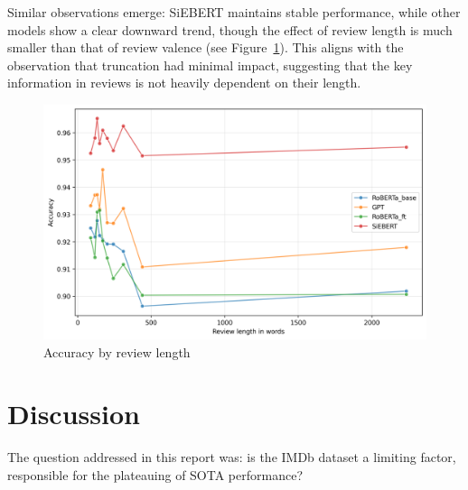 \documentclass{article}
\begin{document}
Similar observations emerge: SiEBERT maintains stable performance, while other models show a clear downward trend, though the effect of review length is much smaller than that of review valence (see Figure~\ref{fig:accuracy-length}). This aligns with the observation that truncation had minimal impact, suggesting that the key information in reviews is not heavily dependent on their length.

\begin{figure}
  \centering
  \includegraphics[width=\textwidth]{figures/accuracy_vs_wordcount.png}
  \caption{Accuracy by review length}
  \label{fig:accuracy-length}
\end{figure}

\section{Discussion}

The question addressed in this report was: is the IMDb dataset a limiting factor, responsible for the plateauing of SOTA performance?
\end{document}
